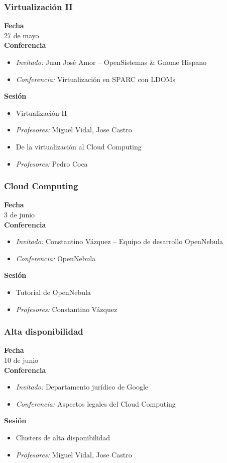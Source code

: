 \documentclass{beamer}
\begin{document}
\begin{frame}
  \frametitle{Virtualización II}
  \textbf{Fecha}\\
    27 de mayo\\
  \textbf{Conferencia}
    \begin{itemize}
      \item \textit{Invitado:} Juan José Amor -- OpenSistemas \& Gnome Hispano
      \item \textit{Conferencia:} Virtualización en SPARC con LDOMs
    \end{itemize}
  \textbf{Sesión}
    \begin{itemize}
      \item Virtualización II
      \item \textit{Profesores:} Miguel Vidal, Jose Castro
    \end{itemize}
    \begin{itemize}
      \item De la virtualización al Cloud Computing
      \item \textit{Profesores:} Pedro Coca
    \end{itemize}
\end{frame}

\begin{frame}
  \frametitle{Cloud Computing}
  \textbf{Fecha}\\
    3 de junio\\
  \textbf{Conferencia}
    \begin{itemize}
      \item \textit{Invitado:} Constantino Vázquez -- Equipo de desarrollo OpenNebula
      \item \textit{Conferencia:} OpenNebula
    \end{itemize}
  \textbf{Sesión}
    \begin{itemize}
      \item Tutorial de OpenNebula
      \item \textit{Profesores:} Constantino Vázquez
    \end{itemize}
\end{frame}

\begin{frame}
  \frametitle{Alta disponibilidad}
  \textbf{Fecha}\\
    10 de junio\\
  \textbf{Conferencia}
    \begin{itemize}
      \item \textit{Invitado:} Departamento jurídico de Google
      \item \textit{Conferencia:} Aspectos legales del Cloud Computing
    \end{itemize}
  \textbf{Sesión}
    \begin{itemize}
      \item Clusters de alta disponibilidad
      \item \textit{Profesores:} Miguel Vidal, Jose Castro
    \end{itemize}
\end{frame}
\end{document}
